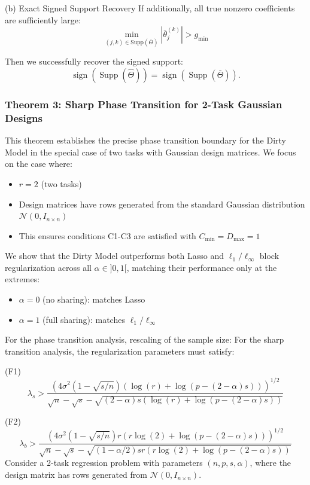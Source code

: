 \documentclass{article}
\begin{document}
(b) Exact Signed Support Recovery
If additionally, all true nonzero coefficients are sufficiently large:
$$\min_{(j,k) \in \text{Supp}(\bar{\Theta})} |\bar{\theta}^{(k)}_j| > g_{\min}$$

Then we successfully recover the signed support:
$$\operatorname{sign}(\operatorname{Supp}(\hat{\Theta})) = \operatorname{sign}(\operatorname{Supp}(\bar{\Theta})).$$

\subsubsection{Theorem 3: Sharp Phase Transition for 2-Task Gaussian Designs}
This theorem establishes the precise phase transition boundary for the Dirty Model in the special case of two tasks with Gaussian design matrices.
We focus on the case where:
\begin{itemize}
    \item $r = 2$ (two tasks)
    \item Design matrices have rows generated from the standard Gaussian distribution $\mathcal{N}(0, I_{n \times n})$
    \item This ensures conditions C1-C3 are satisfied with $C_{\min} = D_{\max} = 1$
\end{itemize}
We show that the Dirty Model outperforms both Lasso and $\ell_1/\ell_\infty$ block regularization across all $\alpha \in ]0,1[$, matching their performance only at the extremes:
\begin{itemize}
    \item $\alpha = 0$ (no sharing): matches Lasso
    \item $\alpha = 1$ (full sharing): matches $\ell_1/\ell_\infty$
\end{itemize}
For the phase transition analysis, rescaling of the sample size:
For the sharp transition analysis, the regularization parameters must satisfy:

(F1)
\begin{equation*}
\lambda_s > \frac{\left(4\sigma^2(1 - \sqrt{s/n})(\log(r) + \log(p - (2-\alpha)s))\right)^{1/2}}{\sqrt{n} - \sqrt{s} - \sqrt{(2-\alpha)s(\log(r) + \log(p - (2-\alpha)s))}}
\end{equation*}

(F2)
\begin{equation*}
\lambda_b > \frac{\left(4\sigma^2(1 - \sqrt{s/n})r(r\log(2) + \log(p - (2-\alpha)s))\right)^{1/2}}{\sqrt{n} - \sqrt{s} - \sqrt{(1 - \alpha/2)sr(r\log(2) + \log(p - (2-\alpha)s))}}
\end{equation*}
Consider a 2-task regression problem with parameters $(n, p, s, \alpha)$, where the design matrix has rows generated from $\mathcal{N}(0, I_{n \times n})$.
\end{document}
